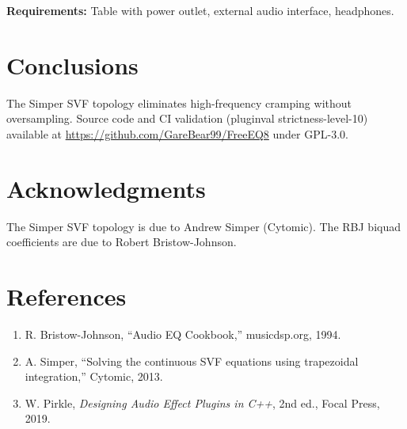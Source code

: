 \documentclass[twoside,a4paper]{article}
\begin{document}
\textbf{Requirements:} Table with power outlet, external audio interface, headphones.

\section{Conclusions}
The Simper SVF topology eliminates high-frequency cramping without oversampling. Source code and CI validation (pluginval strictness-level-10) available at \url{https://github.com/GareBear99/FreeEQ8} under GPL-3.0.

\section{Acknowledgments}
The Simper SVF topology is due to Andrew Simper (Cytomic). The RBJ biquad coefficients are due to Robert Bristow-Johnson.

\section*{References}
\begin{enumerate}
\item R. Bristow-Johnson, ``Audio EQ Cookbook,'' musicdsp.org, 1994.
\item A. Simper, ``Solving the continuous SVF equations using trapezoidal integration,'' Cytomic, 2013.
\item W. Pirkle, \textit{Designing Audio Effect Plugins in C++}, 2nd ed., Focal Press, 2019.
\end{enumerate}
\end{document}
